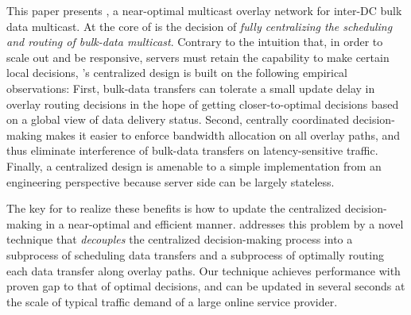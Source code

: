 This paper presents {\em \name}, a near-optimal multicast
overlay network for inter-DC bulk data multicast.
At the core of \name is the decision of {\em fully centralizing
the scheduling and routing of bulk-data multicast}.
Contrary to the intuition that, in order to scale out
and be responsive, servers must retain the capability to make
certain local decisions, \name's centralized design
is built on the following empirical observations: 
First, bulk-data transfers can tolerate a small update delay in
overlay routing decisions
in the hope of getting closer-to-optimal decisions based on
a global view of data delivery status.
Second, centrally coordinated decision-making makes it easier
to enforce bandwidth allocation on all overlay paths,
and thus eliminate interference of bulk-data
transfers on latency-sensitive traffic.
Finally, a centralized design is amenable to a simple
implementation from an engineering perspective because server side can be largely stateless.



The key for \name to realize these benefits is how to
update the centralized decision-making in a near-optimal and
efficient manner.
\name addresses this problem by a novel technique that
{\em decouples} the centralized decision-making process into a
subprocess of scheduling data transfers and a subprocess of
optimally routing each data transfer along overlay paths.
Our technique achieves performance with proven gap to that of
optimal decisions, and can be updated in several seconds at the
scale of typical traffic demand of a large online service
provider.


